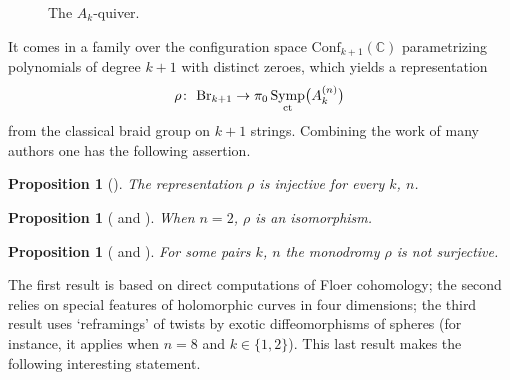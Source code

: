 \documentclass[pdftex]{sigma}
\DeclareMathOperator{\Symp}{Symp}
\def\bC{\mathbb{C}}
\newtheorem{prop}[thm]{Proposition}
\theoremstyle{definition}
\numberwithin{equation}{section}
\begin{document}
\begin{figure}[h]
	\centering
	\caption{The $A_k$-quiver.}
\end{figure}

It comes in a family over the configuration space $\mathrm{Conf}_{k+1}(\bC)$ parametrizing polynomials of degree $k+1$ with distinct zeroes, which yields a representation
\[
\rho\colon \ {\rm Br}_{k+1} \to \pi_0\Symp_{\rm ct}\bigl(A_k^{(n)}\bigr)
\]
from the classical braid group on $k+1$ strings. Combining the work of many authors one has the following assertion.

\begin{prop}[{\cite[Corollary 1.4]{Khovanov-Seidel}}]
The representation $\rho$ is injective for every $k$, $n$.
\end{prop}

\begin{prop}[{\cite[Theorem~1.4]{Evans} and \cite[Theorem~1.2]{Wu}}]
When $n=2$, $\rho$ is an isomorphism.
\end{prop}

\begin{prop}[{\cite[Corollary 17.17]{Seidel:FCPLT} and \cite[Theorem A]{DRE}}]
 For some pairs $k$, $n$ the monodromy $\rho$ is not surjective.
\end{prop}

The first result is based on direct computations of Floer cohomology; the second relies on special features of holomorphic curves in four dimensions; the third result uses `reframings' of twists by exotic diffeomorphisms of spheres (for instance, it applies when $n=8$ and $k\in\{1,2\}$). This last result makes the following interesting statement.
\end{document}

